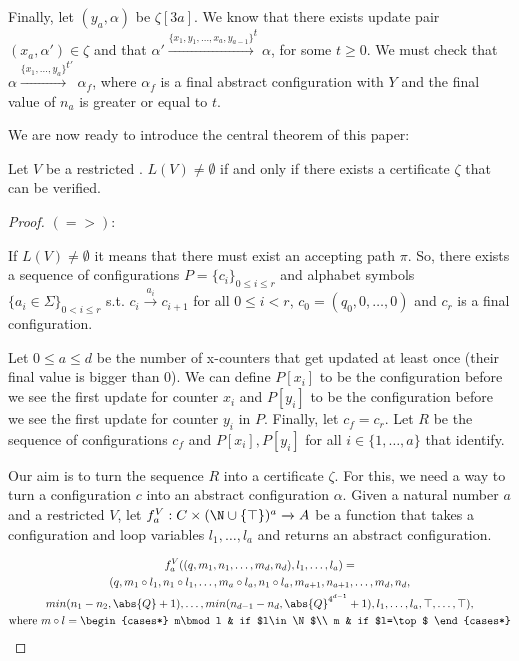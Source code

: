 Finally, let $(y_a,\alpha)$ be $\zeta[3a]$. We know that there exists update pair $(x_a,\alpha')\in\zeta$ and that $\alpha'\xrightarrow{\{x_1,y_1,\dots,x_a,y_{a-1}\}}^t\alpha$, for some $t\geq 0$. We must check that $\alpha\xrightarrow{\{x_1,\dots,y_a\}}^{t'} \alpha_f$, where $\alpha_f$ is a final abstract configuration with $Y$ and the final value of $n_a$ is greater or equal to $t$. 


We are now ready to introduce the central theorem of this paper:
\begin{theorem}
Let $V$ be a restricted \laVASS. $L(V)\neq\emptyset$ if and only if there exists a certificate $\zeta$ that can be verified.
\end{theorem}
\begin{proof}

$(=>):$

If $L(V)\neq\emptyset$ it means that there must exist an accepting path $\pi$. So, there exists a sequence of configurations $P = \{c_i\}_{0\leq i\leq r}$ and alphabet symbols $\{a_i\in\Sigma\}_{0<i\leq r}$ s.t. $c_i\xrightarrow{a_i}c_{i+1}$ for all $0\leq i< r$, $c_0=(q_0,0,\dots,0)$ and $c_r$ is a final configuration. 

Let $0\leq a\leq d$ be the number of x-counters that get updated at least once (their final value is bigger than 0). We can define $P[x_i]$ to be the configuration before we see the first update for counter $x_i$ and $P[y_i]$ to be  the configuration before we see the first update for counter $y_i$ in $P$. Finally, let $c_f=c_r$. Let $R$ be the sequence of configurations $c_f$ and $P[x_i],P[y_i]$ for all $i\in\{1,\dots,a\}$ that identify.

Our aim is to turn the sequence $R$ into a certificate $\zeta$. For this, we need a way to turn a configuration $c$ into an abstract configuration $\alpha$. Given a natural number $a$ and a restricted \laVASS $V$, let $f_a^V:C\times (\N\cup\{\top\})^a\xrightarrow{}A$ be a function that takes a configuration and loop variables $l_1,\dots,l_a$ and returns an abstract configuration. 

\begin{gather*}
f_a^V((q,m_1,n_1,\dots,m_d,n_d),l_1,\dots,l_a)=\\
(q,m_1\circ l_1,n_1\circ l_1,\dots,m_a\circ l_a,n_1\circ l_a,m_{a+1},n_{a+1},\dots,m_d,n_d,\\
min(n_1-n_2,\abs{Q}+1),\dots,min(n_{d-1}-n_{d},\abs{Q}^{4^{d-1}}+1),l_1,\dots,l_a,\top,\dots,\top),\\
\text{where } m\circ l=
\begin{cases*}
m\bmod l & if $l\in\N$\\
m & if $l=\top$
\end{cases*}
\end{gather*}


\end{proof}
